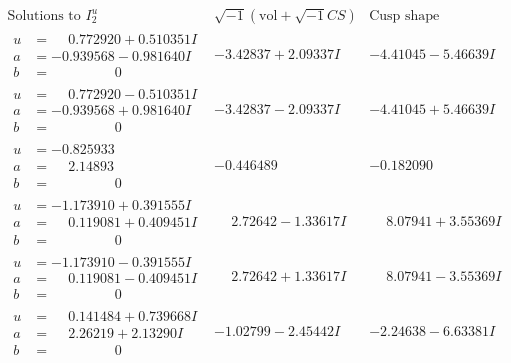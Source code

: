 \documentclass[1p]{elsarticle_modified}
\theoremstyle{definition}
\newcommand{\I}{\sqrt{-1}}
\begin{document}
$$\begin{array}{c|c|c}  
\text{Solutions to }I^u_{2}& \I (\text{vol} + \sqrt{-1}CS) & \text{Cusp shape}\\
 \hline 
\begin{aligned}
u &= \phantom{-}0.772920 + 0.510351 I \\
a &= -0.939568 - 0.981640 I \\
b &= \phantom{-0.000000 } 0\end{aligned}
 & -3.42837 + 2.09337 I & -4.41045 - 5.46639 I \\ \hline\begin{aligned}
u &= \phantom{-}0.772920 - 0.510351 I \\
a &= -0.939568 + 0.981640 I \\
b &= \phantom{-0.000000 } 0\end{aligned}
 & -3.42837 - 2.09337 I & -4.41045 + 5.46639 I \\ \hline\begin{aligned}
u &= -0.825933\phantom{ +0.000000I} \\
a &= \phantom{-}2.14893\phantom{ +0.000000I} \\
b &= \phantom{-0.000000 } 0\end{aligned}
 & -0.446489\phantom{ +0.000000I} & -0.182090\phantom{ +0.000000I} \\ \hline\begin{aligned}
u &= -1.173910 + 0.391555 I \\
a &= \phantom{-}0.119081 + 0.409451 I \\
b &= \phantom{-0.000000 } 0\end{aligned}
 & \phantom{-}2.72642 - 1.33617 I & \phantom{-}8.07941 + 3.55369 I \\ \hline\begin{aligned}
u &= -1.173910 - 0.391555 I \\
a &= \phantom{-}0.119081 - 0.409451 I \\
b &= \phantom{-0.000000 } 0\end{aligned}
 & \phantom{-}2.72642 + 1.33617 I & \phantom{-}8.07941 - 3.55369 I \\ \hline\begin{aligned}
u &= \phantom{-}0.141484 + 0.739668 I \\
a &= \phantom{-}2.26219 + 2.13290 I \\
b &= \phantom{-0.000000 } 0\end{aligned}
 & -1.02799 - 2.45442 I & -2.24638 - 6.63381 I \\ \hline\begin{aligned}

\end{aligned}
\end{array}$$
\end{document}
